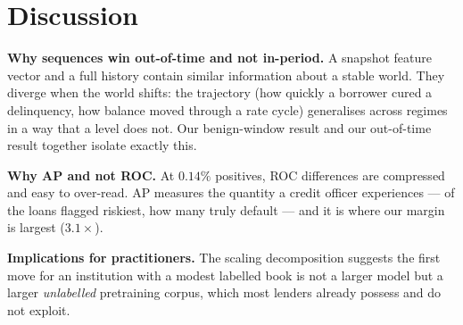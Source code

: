 \documentclass[10pt,letterpaper]{article}
\begin{document}
\section{Discussion}
\label{sec:discussion}

\textbf{Why sequences win out-of-time and not in-period.} A snapshot feature vector and a full
history contain similar information about a stable world. They diverge when the world shifts: the
trajectory (how quickly a borrower cured a delinquency, how balance moved through a rate cycle)
generalises across regimes in a way that a level does not. Our benign-window result and our
out-of-time result together isolate exactly this.

\textbf{Why AP and not ROC.} At $0.14\%$ positives, ROC differences are compressed and easy to
over-read. AP measures the quantity a credit officer experiences --- of the loans flagged riskiest,
how many truly default --- and it is where our margin is largest ($3.1\times$).

\textbf{Implications for practitioners.} The scaling decomposition suggests the first move for an
institution with a modest labelled book is not a larger model but a larger \emph{unlabelled} pretraining
corpus, which most lenders already possess and do not exploit.
\end{document}
